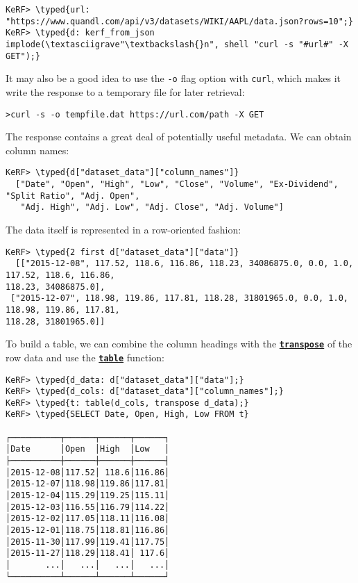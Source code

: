 \documentclass{article}
\newcommand{\typed}[1]{\textcolor{TealBlue}{#1}}
\newcommand{\primu}[2]{\hyperref[prim:#2]{\textbf{\texttt{#1}}}}
\newcommand{\prim}[1]{\primu{#1}{#1}}
\begin{document}
\begin{Verbatim}
KeRF> \typed{url: "https://www.quandl.com/api/v3/datasets/WIKI/AAPL/data.json?rows=10";}
KeRF> \typed{d: kerf_from_json implode(\textasciigrave"\textbackslash{}n", shell "curl -s "#url#" -X GET");}
\end{Verbatim}

It may also be a good idea to use the \texttt{-o} flag option with \texttt{curl}, which makes it write the response to a temporary file for later retrieval:

\begin{Verbatim}
>curl -s -o tempfile.dat https://url.com/path -X GET
\end{Verbatim}

The response contains a great deal of potentially useful metadata. We can obtain column names:
\begin{Verbatim}
KeRF> \typed{d["dataset_data"]["column_names"]}
  ["Date", "Open", "High", "Low", "Close", "Volume", "Ex-Dividend", "Split Ratio", "Adj. Open",
   "Adj. High", "Adj. Low", "Adj. Close", "Adj. Volume"]
\end{Verbatim}

The data itself is represented in a row-oriented fashion:
\begin{Verbatim}
KeRF> \typed{2 first d["dataset_data"]["data"]}
  [["2015-12-08", 117.52, 118.6, 116.86, 118.23, 34086875.0, 0.0, 1.0, 117.52, 118.6, 116.86,
118.23, 34086875.0], 
 ["2015-12-07", 118.98, 119.86, 117.81, 118.28, 31801965.0, 0.0, 1.0, 118.98, 119.86, 117.81,
118.28, 31801965.0]]
\end{Verbatim}

\pagebreak
To build a table, we can combine the column headings with the \prim{transpose} of the row data and use the \prim{table} function:
\begin{Verbatim}
KeRF> \typed{d_data: d["dataset_data"]["data"];}
KeRF> \typed{d_cols: d["dataset_data"]["column_names"];}
KeRF> \typed{t: table(d_cols, transpose d_data);}
KeRF> \typed{SELECT Date, Open, High, Low FROM t}

┌──────────┬──────┬──────┬──────┐
│Date      │Open  │High  │Low   │
├──────────┼──────┼──────┼──────┤
│2015-12-08│117.52│ 118.6│116.86│
│2015-12-07│118.98│119.86│117.81│
│2015-12-04│115.29│119.25│115.11│
│2015-12-03│116.55│116.79│114.22│
│2015-12-02│117.05│118.11│116.08│
│2015-12-01│118.75│118.81│116.86│
│2015-11-30│117.99│119.41│117.75│
│2015-11-27│118.29│118.41│ 117.6│
│       ...│   ...│   ...│   ...│
└──────────┴──────┴──────┴──────┘
\end{Verbatim}
\end{document}
